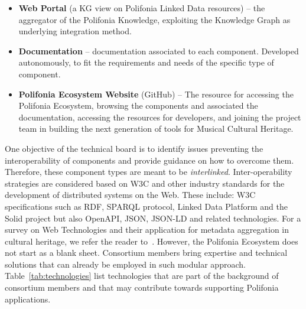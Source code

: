 \begin{itemize}
\item \textbf{Web Portal} (a KG view on Polifonia Linked Data resources) -- the aggregator of the Polifonia Knowledge, exploiting the Knowledge Graph as underlying integration method.
\item \textbf{Documentation} -- documentation associated to each component. Developed autonomously, to fit the requirements and needs of the specific type of component.
\item \textbf{Polifonia Ecosystem Website} (GitHub) -- The resource for accessing the Polifonia Ecosystem, browsing the components and associated the documentation, accessing the resources for developers, and joining the project team in building the next generation of tools for Musical Cultural Heritage.
\end{itemize}


One objective of the technical board is to identify issues preventing the interoperability of components and provide guidance on how to overcome them. Therefore, these component types are meant to be \textit{interlinked}. Inter-operability strategies are considered based on W3C and other industry standards for the development of distributed systems on the Web.
These include: W3C specifications such as RDF, SPARQL protocol, Linked Data Platform and the Solid project but also OpenAPI, JSON, JSON-LD and related technologies.
For a survey on  Web Technologies and their application for metadata aggregation in cultural heritage, we refer the reader to~\cite{freire2017web,daga2021integrating}.
However, the Polifonia Ecosystem does not start as a blank sheet. 
Consortium members bring expertise and technical solutions that can already be employed in such modular approach.
Table~\ref{tab:technologies} list technologies that are part of the background of consortium members and that may contribute towards supporting Polifonia applications.

